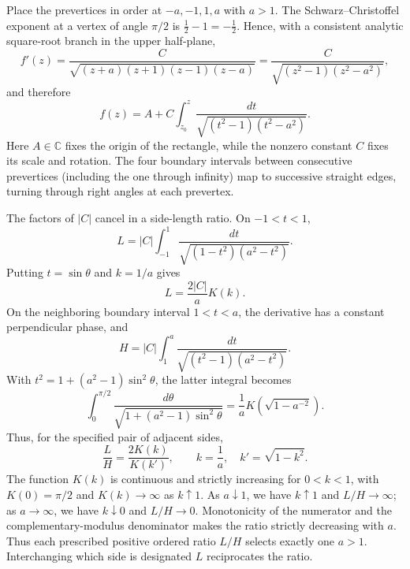\begin{solution}Place the prevertices in order at $-a,-1,1,a$ with $a>1$.
The Schwarz--Christoffel exponent at a vertex of angle $\pi/2$ is
$\frac12-1=-\frac12$. Hence, with a consistent analytic square-root branch
in the upper half-plane,
\[
f'(z)=\frac{C}{\sqrt{(z+a)(z+1)(z-1)(z-a)}}
=\frac{C}{\sqrt{(z^2-1)(z^2-a^2)}},
\]
and therefore
\[
\boxed{\quad f(z)=A+C\int_{z_0}^{z}
\frac{dt}{\sqrt{(t^2-1)(t^2-a^2)}}.\quad}
\]
Here $A\in\mathbb C$ fixes the origin of the rectangle, while the nonzero
constant $C$ fixes its scale and rotation. The four boundary intervals
between consecutive prevertices (including the one through infinity) map to
successive straight edges, turning through right angles at each prevertex.

The factors of $|C|$ cancel in a side-length ratio. On $-1<t<1$,
\[
L=|C|\int_{-1}^{1}
\frac{dt}{\sqrt{(1-t^2)(a^2-t^2)}}.
\]
Putting $t=\sin\theta$ and $k=1/a$ gives
\[
L=\frac{2|C|}{a}K(k).
\]
On the neighboring boundary interval $1<t<a$, the derivative has a
constant perpendicular phase, and
\[
H=|C|\int_1^a
\frac{dt}{\sqrt{(t^2-1)(a^2-t^2)}}.
\]
With $t^2=1+(a^2-1)\sin^2\theta$, the latter integral becomes
\[
\int_0^{\pi/2}\frac{d\theta}
{\sqrt{1+(a^2-1)\sin^2\theta}}
=\frac{1}{a}K\!\left(\sqrt{1-a^{-2}}\right).
\]
Thus, for the specified pair of adjacent sides,
\[
\boxed{\quad
\frac{L}{H}
=\frac{2K(k)}{K(k')},\qquad
k=\frac1a,\quad k'=\sqrt{1-k^2}.
\quad}
\]
The function $K(k)$ is continuous and strictly increasing for $0<k<1$,
with $K(0)=\pi/2$ and $K(k)\to\infty$ as $k\uparrow1$.
As $a\downarrow1$, we have $k\uparrow1$ and $L/H\to\infty$;
as $a\to\infty$, we have $k\downarrow0$ and $L/H\to0$.
Monotonicity of the numerator and the complementary-modulus denominator
makes the ratio strictly decreasing with $a$. Thus each prescribed
positive ordered ratio $L/H$ selects exactly one $a>1$.
Interchanging which side is designated $L$ reciprocates the ratio.
\end{solution}

